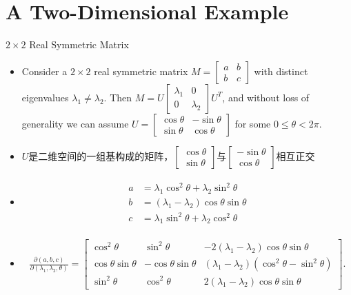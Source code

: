 \documentclass[UTF8,AutoFakeBold,AutoFakeSlant]{beamer}
\begin{document}
\section{A Two-Dimensional Example}

\begin{frame}{$2\times 2$ Real Symmetric Matrix}
    \begin{itemize}
        \scriptsize
        \item Consider a $2\times 2$ real symmetric matrix $M=\begin{bmatrix}a&b\\b&c\end{bmatrix}$ with distinct eigenvalues $\lambda_1\neq\lambda_2$. Then $M=U\begin{bmatrix}\lambda_1&0\\0&\lambda_2\end{bmatrix}U^T$, and without loss of generality we can assume $U=\begin{bmatrix} \cos\theta &-\sin\theta \\ \sin\theta & \cos\theta \end{bmatrix}$ for some $0\leq\theta<2\pi$.
        \item $U$是二维空间的一组基构成的矩阵，$\begin{bmatrix}\cos\theta \\ \sin\theta\end{bmatrix}$与$\begin{bmatrix}-\sin\theta \\ \cos\theta\end{bmatrix}$相互正交
        \item
              \begin{align*}
                  \begin{split}
                      a & =\lambda_{1}\cos^{2}\theta+\lambda_{2}\sin^{2}\theta \\
                      b & =(\lambda_1-\lambda_2)\cos\theta\sin\theta           \\
                      c & =\lambda_{1}\sin^{2}\theta+\lambda_{2}\cos^{2}\theta
                  \end{split}
              \end{align*}
        \item
              \begin{align*}
                  \frac{\partial(a,b,c)}{\partial(\lambda_1,\lambda_2,\theta)}=\begin{bmatrix}\cos^2\theta&\sin^2\theta&-2(\lambda_1-\lambda_2)\cos\theta\sin\theta\\\cos\theta\sin\theta&-\cos\theta\sin\theta&(\lambda_1-\lambda_2)(\cos^2\theta-\sin^2\theta)\\\sin^2\theta&\cos^2\theta&2(\lambda_1-\lambda_2)\cos\theta\sin\theta\end{bmatrix}.
              \end{align*}
    \end{itemize}
\end{frame}
\end{document}
